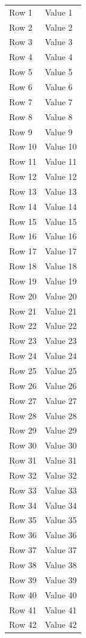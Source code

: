 \documentclass{article}
\begin{document}
\begin{longtable}{ll}
Row 1 & Value 1 \\
Row 2 & Value 2 \\
Row 3 & Value 3 \\
Row 4 & Value 4 \\
Row 5 & Value 5 \\
Row 6 & Value 6 \\
Row 7 & Value 7 \\
Row 8 & Value 8 \\
Row 9 & Value 9 \\
Row 10 & Value 10 \\
Row 11 & Value 11 \\
Row 12 & Value 12 \\
Row 13 & Value 13 \\
Row 14 & Value 14 \\
Row 15 & Value 15 \\
Row 16 & Value 16 \\
Row 17 & Value 17 \\
Row 18 & Value 18 \\
Row 19 & Value 19 \\
Row 20 & Value 20 \\
Row 21 & Value 21 \\
Row 22 & Value 22 \\
Row 23 & Value 23 \\
Row 24 & Value 24 \\
Row 25 & Value 25 \\
Row 26 & Value 26 \\
Row 27 & Value 27 \\
Row 28 & Value 28 \\
Row 29 & Value 29 \\
Row 30 & Value 30 \\
Row 31 & Value 31 \\
Row 32 & Value 32 \\
Row 33 & Value 33 \\
Row 34 & Value 34 \\
Row 35 & Value 35 \\
Row 36 & Value 36 \\
Row 37 & Value 37 \\
Row 38 & Value 38 \\
Row 39 & Value 39 \\
Row 40 & Value 40 \\
Row 41 & Value 41 \\
Row 42 & Value 42 \\

\end{longtable}
\end{document}

